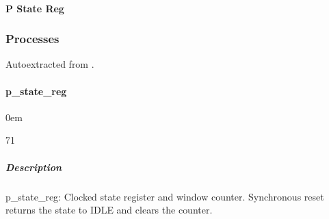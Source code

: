 \documentclass[letterpaper,10pt,english]{sphinxmanual}
\begin{document}
\paragraph{P State Reg}
\label{\detokenize{modules/sample_ctrl/timing:p-state-reg}}
\noindent{}

\sphinxstepscope


\subsubsection{Processes}
\label{\detokenize{modules/sample_ctrl/processes/index:processes}}\label{\detokenize{modules/sample_ctrl/processes/index::doc}}
\sphinxAtStartPar
Auto\sphinxhyphen{}extracted from .

\sphinxstepscope


\paragraph{p\_state\_reg}
\label{\detokenize{modules/sample_ctrl/processes/p_state_reg:p-state-reg}}\label{\detokenize{modules/sample_ctrl/processes/p_state_reg::doc}}
\begin{DUlineblock}{0em}
\item[]  
\item[]  71
\item[]  
\item[]  
\end{DUlineblock}


\subparagraph{Description}
\label{\detokenize{modules/sample_ctrl/processes/p_state_reg:description}}
\sphinxAtStartPar
p\_state\_reg: Clocked state register and window counter.
Synchronous reset returns the state to IDLE and clears the counter.

\noindent{}
\end{document}
